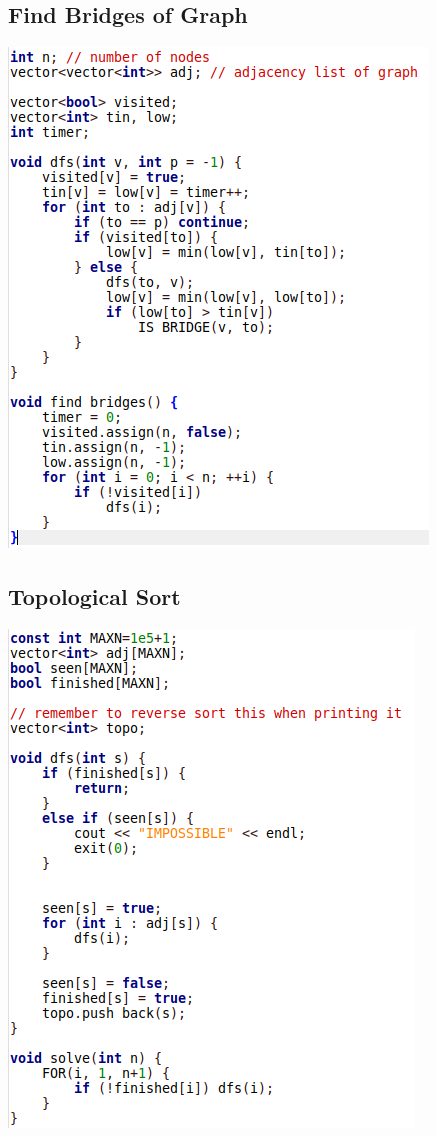 \documentclass[11pt,twocolumn]{article}
\begin{document}
\subsection{Find Bridges of Graph}
\includegraphics[scale=0.5]{bridges}
\subsection{Topological Sort}
\includegraphics[scale=0.5]{topological}
\end{document}
